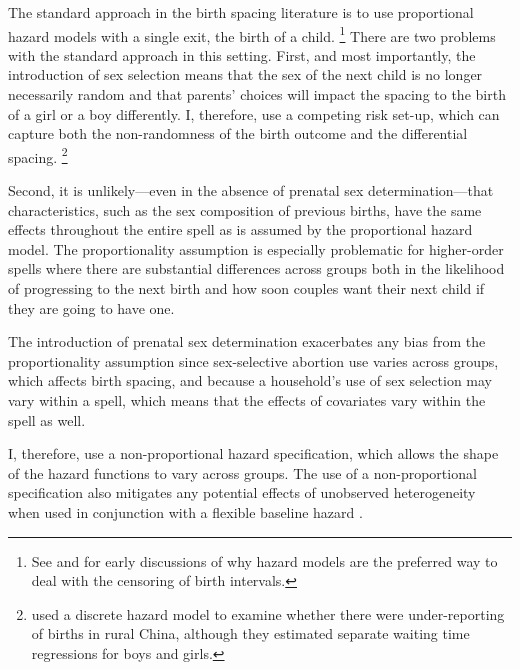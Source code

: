 \documentclass[12pt,letterpaper]{article}
\begin{document}
The standard approach in the birth spacing literature is to use proportional hazard
models with a single exit, the birth of a child.%
\footnote{
See \citet{Sheps1970} and \citet{Newman1984} for early discussions of why 
hazard models are the preferred way to deal with the censoring of birth
intervals.
}
There are two problems with the standard approach in this setting.
First, and most importantly, the introduction of sex selection means that the sex of the 
next child is no longer necessarily random and that parents' choices will impact the 
spacing to the birth of a girl or a boy differently.
I, therefore, use a competing risk set-up, which can capture both the non-randomness of
the birth outcome and the differential spacing.%
\footnote{
\cite{Merli2000} used a discrete hazard model to examine whether 
there were under-reporting of births in rural China, although they 
estimated separate waiting time regressions for boys and girls.
}

Second, it is unlikely---even in the absence of prenatal sex determination---that 
characteristics, such as the sex composition of previous births, have the same effects 
throughout the entire spell as is assumed by the proportional hazard model.
The proportionality assumption is especially problematic for higher-order spells where 
there are substantial differences across groups both in the likelihood of progressing to 
the next birth and how soon couples want their next child if they are going to have one.

The introduction of prenatal sex determination exacerbates any bias from the 
proportionality assumption since sex-selective abortion use varies across groups,
which affects birth spacing, and because a household's use of sex selection may vary 
within a spell, which means that the effects of covariates vary within the spell as well.

I, therefore, use a non-proportional hazard specification, which allows the shape of the 
hazard functions to vary across groups.
The use of a non-proportional specification also mitigates any potential effects 
of unobserved heterogeneity when used in conjunction with a flexible baseline hazard 
\citep{Dolton1995}.
\end{document}
